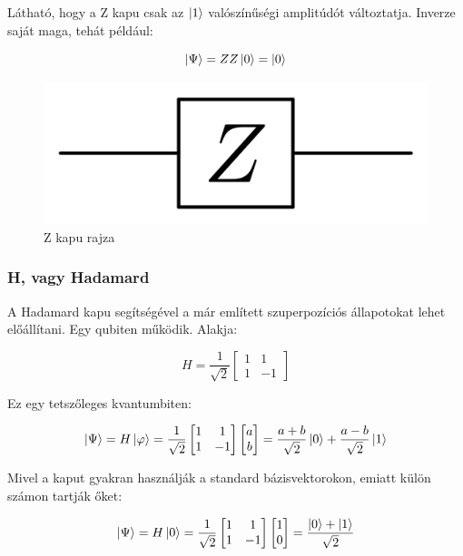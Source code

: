 \documentclass[
]{thesis-ekf}
\theoremstyle{definition}
\theoremstyle{remark}
\begin{document}
Látható, hogy a Z kapu csak az $\ket{1}$ valószínűségi amplitúdót változtatja. Inverze saját maga, tehát például:

\begin{equation}
	\ket{\Psi}=ZZ\ket{0}=\ket{0}
\end{equation}

\begin{figure}[H]
	\centering
	\includegraphics[width=0.3\linewidth]{Pauli_Z}
	\caption{Z kapu rajza}
	\label{fig:pauliz}
\end{figure}

\subsubsection{H, vagy Hadamard}
A Hadamard kapu segítségével a már említett szuperpozíciós állapotokat lehet előállítani. Egy qubiten működik. Alakja:

\begin{equation}
	H= \frac{1}{\sqrt{2}}
	\begin{bmatrix}
		1 & 1\\
		1 & -1
	\end{bmatrix}
\end{equation}

Ez egy tetszőleges kvantumbiten:

\begin{equation}
	\ket{\Psi}=H\ket{\varphi}=\frac{1}{\sqrt{2}}
	\begin{bmatrix}
		1 & 1\\
		1 & -1
	\end{bmatrix}
	\begin{bmatrix}
		a\\
		b
	\end{bmatrix}=\frac{a+b}{\sqrt{2}}\ket{0}+\frac{a-b}{\sqrt{2}}\ket{1}
\end{equation}

Mivel a kaput gyakran használják a standard bázisvektorokon, emiatt külön számon tartják őket:

\begin{equation}
	\ket{\Psi}=H\ket{0}=\frac{1}{\sqrt{2}}
	\begin{bmatrix}
		1 & 1\\
		1 & -1
	\end{bmatrix}
	\begin{bmatrix}
		1\\
		0
	\end{bmatrix}=\frac{\ket{0}+\ket{1}}{\sqrt{2}}
\end{equation}
\end{document}
